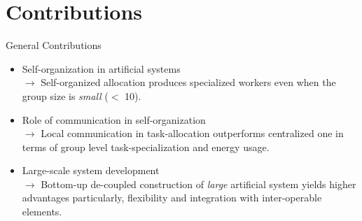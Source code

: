 \documentclass{beamer}
\begin{document}
\section{Contributions}
\begin{frame}[t]{General Contributions}
%
\begin{itemize}
    \item \normalsize \alert{Self-organization in artificial systems}\\ 
$\rightarrow$ \small Self-organized allocation produces specialized workers even when the group size is \textit{small} ($<$ 10).
    \item \normalsize \alert{Role of communication in self-organization}\\
$\rightarrow$ \small  Local communication in task-allocation outperforms centralized one in terms of group level task-specialization and energy usage.
\item \normalsize \alert{Large-scale system development}\\
$\rightarrow$ \small Bottom-up de-coupled construction of \textit{large} artificial system yields higher advantages particularly, flexibility and integration with inter-operable elements.%
\end{itemize}
%
\end{frame}
%
\end{document}
